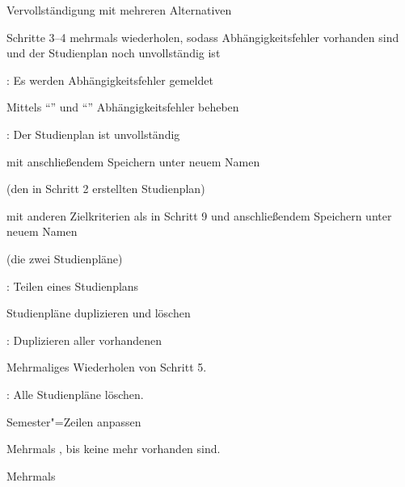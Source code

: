 \begin{scenario}{Vervollständigung mit mehreren Alternativen}
	\item {}
	\item {}
	\item {}
	\item {}
	\item Schritte 3–4 mehrmals wiederholen, sodass Abhängigkeitsfehler vorhanden sind und der \gls{Studienplan} noch unvollständig ist
	\item {}: Es werden Abhängigkeitsfehler gemeldet
	\item Mittels \enquote{} und \enquote{} Abhängigkeitsfehler beheben
	\item {}: Der Studienplan ist unvollständig
	\item {} mit anschließendem Speichern unter neuem Namen
	\item {}
	\item {} (den in Schritt 2 erstellten Studienplan)
	\item {} mit anderen Zielkriterien als in Schritt 9 und anschließendem Speichern unter neuem Namen
	\item {}
	\item {} (die zwei  Studienpläne)
	\item {}
	\item {}: Teilen eines Studienplans
\end{scenario}

\begin{scenario}{Studienpläne duplizieren und löschen}
	\item {}
	\item {}
	\item {}
	\item {}
	\item {}: Duplizieren aller vorhandenen 
	\item Mehrmaliges Wiederholen von Schritt 5.
	\item {}: Alle Studienpläne löschen.
\end{scenario}

\begin{scenario}{Semester"=Zeilen anpassen}
	\item {}
	\item {}
	\item Mehrmals , bis keine mehr vorhanden sind.
	\item Mehrmals 
	\item {}
\end{scenario}


